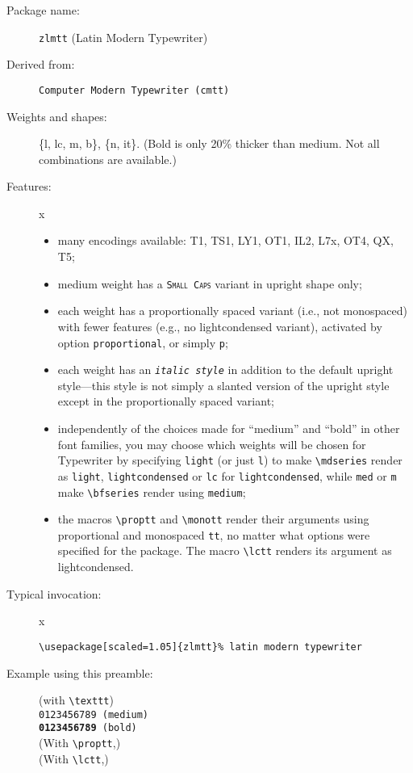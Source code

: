 \documentclass{article}
\begin{document}
\thispagestyle{empty}
\begin{description}
\item[Package name:] {\tt zlmtt} (Latin Modern Typewriter)
\item[Derived from:] {\tt Computer Modern Typewriter (cmtt)}
\item[Weights and shapes:]  \{l, lc, m, b\}, \{n, it\}. (Bold is only 20\% thicker than medium. Not all combinations are available.)
\item[Features:]{\color{white}x}\\[-15pt]  
\begin{itemize}
\item many encodings available: T1, TS1, LY1, OT1, IL2, L7x, OT4, QX, T5;
\item medium weight has a \texttt{\textsc{Small Caps}} variant in upright shape only;
\item each weight has a proportionally spaced variant (i.e., not monospaced) with fewer features (e.g., no lightcondensed variant), activated by option {\tt proportional}, or simply {\tt p};
\item each weight has an \texttt{\textit{italic style}} in addition to the default upright style---this style is not simply a slanted version of the upright style except in the proportionally spaced variant; 
\item independently of the choices made for ``medium'' and ``bold'' in other font families, you may choose which weights will be chosen for Typewriter by specifying {\tt light} (or just {\tt l}) to make \verb|\mdseries| render as {\tt light}, {\tt lightcondensed} or {\tt lc} for {\tt lightcondensed}, while {\tt med} or {\tt m} make \verb|\bfseries| render using {\tt medium};
\item the macros \verb|\proptt| and \verb|\monott| render their arguments using proportional and monospaced {\tt tt}, no matter what options were specified for the package. The macro \verb|\lctt| renders its argument as lightcondensed.
\end{itemize}
\item[Typical invocation:]{\color{white}x}
\begin{verbatim}
\usepackage[scaled=1.05]{zlmtt}% latin modern typewriter
\end{verbatim}
\item[Example using this preamble:] (with \verb|\texttt|)\\[6pt]
\texttt{\lipsum[1]}
\texttt{0123456789 (medium)}\\
\texttt{\textbf{0123456789} (bold)}\\[6pt]
(With \verb|\proptt|,)\\
\proptt{\lipsum[1]}
(With \verb|\lctt|,)\\
\end{description}
\end{document}
